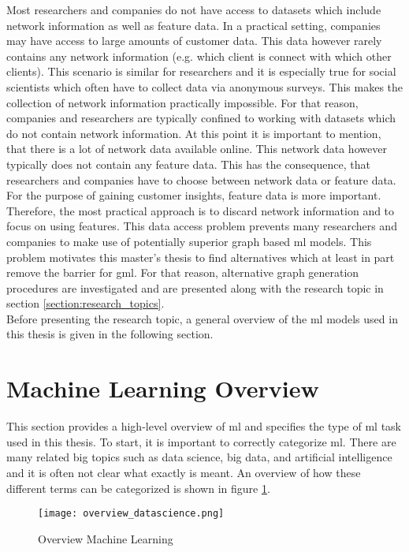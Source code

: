 	\noindent Most researchers and companies do not have access to datasets which
	include network information as well as feature data. In a practical setting,
	companies may have access to large amounts of customer data. This data
	however rarely contains any network information (e.g. which client is
	connect with which other clients). This scenario is similar for researchers
	and it is especially true for social scientists which often have to collect 
	data via anonymous surveys. This makes the collection of network information 
	practically impossible. For that reason, companies and researchers are 
	typically confined to working with datasets which do not contain network 
	information. At this point it is important to mention, that there is a lot 
	of network data available online. This network data however typically does 
	not contain any feature data. This has the consequence, that researchers and 
	companies have to choose between network data or feature data. For the 
	purpose of gaining customer insights, feature data is more important. 
	Therefore, the most practical approach is to discard network information 
	and to focus on using features. This data access problem prevents many 
	researchers and companies to make use of potentially superior graph based 
	\acs{ml} models. This problem motivates this master's thesis to find
	alternatives which at least in part remove the barrier for \acs{gml}. For 
	that reason, alternative graph generation procedures are investigated and 
	are presented along with the research topic in section 
	\ref{section:research_topics}. \\

	\noindent Before presenting the research topic, a general overview of the 
	\acs{ml} models used in this thesis is given in the following section.
	
	\section{Machine Learning Overview}

	This section provides a high-level overview of \acf{ml} and
	specifies the type of \acs{ml} task used in this thesis. To start, it is 
	important to correctly categorize \acs{ml}. There are many related 
	big topics such as data science, big data, and artificial intelligence and 
	it is often not clear what exactly is meant. An overview of how these 
	different terms can be categorized is shown in figure \ref{fig:ml_overview}.

	\begin{figure}[H]
		\centering
		\texttt{[image: overview\_datascience.png]}
		\caption{Overview Machine Learning}
		\citep{Frauenhofer2021}
		\label{fig:ml_overview}
	\end{figure} 

